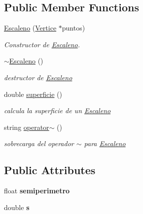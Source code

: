 \subsection*{Public Member Functions}
\begin{DoxyCompactItemize}
\item 
\hyperlink{class_escaleno_a2670875a1c4940661ea68fb97a8e2da1}{Escaleno} (\hyperlink{class_vertice}{Vertice} $\ast$puntos)
\begin{DoxyCompactList}\small\item\em Constructor de \hyperlink{class_escaleno}{Escaleno}. \end{DoxyCompactList}\item 
\mbox{\label{class_escaleno_a49f27943915cf764e133b4ebd24ca060}} 
\hyperlink{class_escaleno_a49f27943915cf764e133b4ebd24ca060}{$\sim$\+Escaleno} ()
\begin{DoxyCompactList}\small\item\em destructor de \hyperlink{class_escaleno}{Escaleno} \end{DoxyCompactList}\item 
\mbox{\label{class_escaleno_a7d71f0f712f7673eca014f1821b78846}} 
double \hyperlink{class_escaleno_a7d71f0f712f7673eca014f1821b78846}{superficie} ()
\begin{DoxyCompactList}\small\item\em calcula la superficie de un \hyperlink{class_escaleno}{Escaleno} \end{DoxyCompactList}\item 
\mbox{\label{class_escaleno_a083472de2f48b2d3da5e11a4d33be38a}} 
string \hyperlink{class_escaleno_a083472de2f48b2d3da5e11a4d33be38a}{operator$\sim$} ()
\begin{DoxyCompactList}\small\item\em sobrecarga del operador $\sim$ para \hyperlink{class_escaleno}{Escaleno} \end{DoxyCompactList}\end{DoxyCompactItemize}
\subsection*{Public Attributes}
\begin{DoxyCompactItemize}
\item 
\mbox{\label{class_escaleno_aa7147d8466b9cd87a787a898fed69eec}} 
float {\bfseries semiperimetro}
\item 
\mbox{\label{class_escaleno_a27961baaa7d8644ca529f200ba968eaa}} 
double {\bfseries s}
\end{DoxyCompactItemize}
